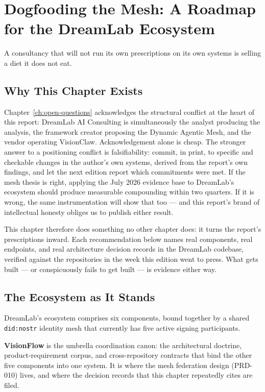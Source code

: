 \chapter{Dogfooding the Mesh: A Roadmap for the DreamLab Ecosystem}
\label{ch:ecosystem-roadmap}

\epigraph{A consultancy that will not run its own prescriptions on its own systems is selling a diet it does not eat.}{}

\section{Why This Chapter Exists}

Chapter~\ref{ch:open-questions} acknowledges the structural conflict at the heart of this report: DreamLab AI Consulting is simultaneously the analyst producing the analysis, the framework creator proposing the Dynamic Agentic Mesh, and the vendor operating VisionClaw. Acknowledgement alone is cheap. The stronger answer to a positioning conflict is falsifiability: commit, in print, to specific and checkable changes in the author's own systems, derived from the report's own findings, and let the next edition report which commitments were met. If the mesh thesis is right, applying the July 2026 evidence base to DreamLab's ecosystem should produce measurable compounding within two quarters. If it is wrong, the same instrumentation will show that too --- and this report's brand of intellectual honesty obliges us to publish either result.

This chapter therefore does something no other chapter does: it turns the report's prescriptions inward. Each recommendation below names real components, real endpoints, and real architecture decision records in the DreamLab codebase, verified against the repositories in the week this edition went to press. What gets built --- or conspicuously fails to get built --- is evidence either way.

\section{The Ecosystem as It Stands}

DreamLab's ecosystem comprises six components, bound together by a shared \texttt{did:nostr} identity mesh that currently has five active signing participants.

\textbf{VisionFlow} is the umbrella coordination canon: the architectural doctrine, product-requirement corpus, and cross-repository contracts that bind the other five components into one system. It is where the mesh federation design (PRD-010) lives, and where the decision records that this chapter repeatedly cites are filed.

